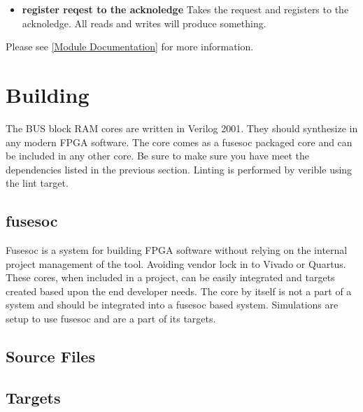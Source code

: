 \begin{itemize}
\item \textbf{register reqest to the acknoledge} Takes the request and registers to the acknoledge. All reads and writes will produce something.
\end{itemize}

Please see \ref{Module Documentation} for more information.

\section{Building}

\par
The BUS block RAM cores are written in Verilog 2001. They should synthesize in any modern FPGA software. The core comes as a fusesoc packaged core and can be included in any other core. Be sure to make sure you have meet the dependencies listed in the previous section. Linting is performed by verible using the lint target.

\subsection{fusesoc}
\par
Fusesoc is a system for building FPGA software without relying on the internal project management of the tool. Avoiding vendor lock in to Vivado or Quartus.
These cores, when included in a project, can be easily integrated and targets created based upon the end developer needs. The core by itself is not a part of
a system and should be integrated into a fusesoc based system. Simulations are setup to use fusesoc and are a part of its targets.

\subsection{Source Files}





\subsection{Targets}





